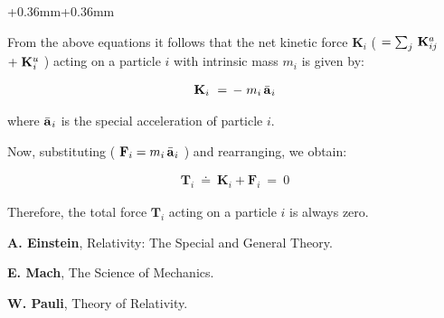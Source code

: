 \documentclass[10pt,fleqn]{article}
\begin{document}
\begin{adjustwidth}{+0.36mm}{+0.36mm}
\par \vspace{+0.60em}
\noindent From the above equations it follows that the net kinetic force $\mathbf{K}_i$ {\small ( $ = \sum_j \, \mathbf{K}^{a}_{\hspace{+0.012em}ij}$ $+ \; \mathbf{K}^{u}_{\hspace{+0.030em}i}$ )} acting on a particle $i$ with intrinsic mass $m_i$ is given by:
\par \vspace{-0.30em}
\begin{eqnarray*}
\mathbf{K}_i ~=\, - \; m_i \, \bar{\mathbf{a}}_{\hspace{+0.045em}i}
\end{eqnarray*}
\par \vspace{+0.90em}
\noindent where $\bar{\mathbf{a}}_{\hspace{+0.045em}i}$ is the special acceleration of particle $i$.
\par \vspace{+0.60em}
\noindent Now, substituting ( $\mathbf{F}_i = m_i \, \bar{\mathbf{a}}_{\hspace{+0.045em}i}$ ) and rearranging, we obtain:
\par \vspace{-0.30em}
\begin{eqnarray*}
\mathbf{T}_i ~\doteq~ \mathbf{K}_i + \mathbf{F}_i ~=~ 0
\end{eqnarray*}
\par \vspace{+0.90em}
\noindent Therefore, the total force $\mathbf{T}_i$ acting on a particle $i$ is always zero.

\vspace{-0.60em}

\par {}

\bigskip \smallskip

\par \noindent \textbf{A. Einstein}, Relativity: The Special and General Theory.
\bigskip \smallskip
\par \noindent \textbf{E. Mach}, The Science of Mechanics.
\bigskip \smallskip
\par \noindent \textbf{W. Pauli}, Theory of Relativity.

\end{adjustwidth}
\end{document}
